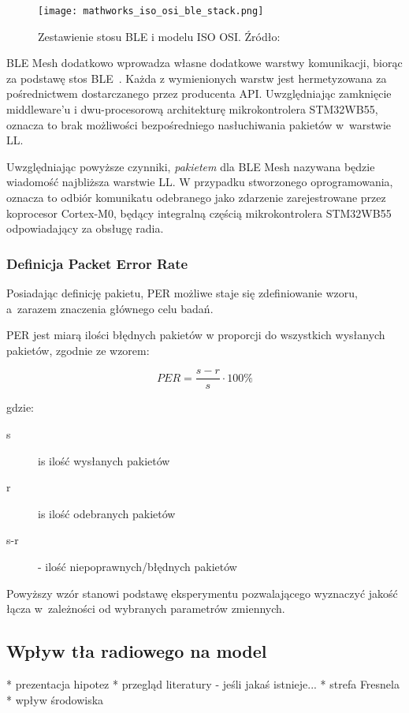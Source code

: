 \begin{figure}[!ht]
	\centering \texttt{[image: mathworks\_iso\_osi\_ble\_stack.png]} 
	\caption{Zestawienie stosu BLE i modelu ISO OSI. Źródło: \cite{noauthor_bluetooth_nodate}}
	\label{rys:agregacja_protokolow_ble}
\end{figure}

BLE Mesh dodatkowo wprowadza własne dodatkowe warstwy komunikacji, biorąc za podstawę stos BLE~\cite{mesh_working_group_mesh_2019}.
Każda z wymienionych warstw jest hermetyzowana za pośrednictwem dostarczanego przez producenta \gls{API}.
Uwzględniając zamknięcie middleware'u i dwu-procesorową architekturę mikrokontrolera STM32WB55, oznacza 
to brak możliwości bezpośredniego nasłuchiwania pakietów w~warstwie \gls{LL}.

Uwzględniając powyższe czynniki, \textit{pakietem} dla BLE Mesh nazywana będzie wiadomość najbliższa warstwie \gls{LL}.
W przypadku stworzonego oprogramowania, oznacza to odbiór komunikatu odebranego jako zdarzenie zarejestrowane przez
koprocesor Cortex-M0, będący integralną częścią mikrokontrolera STM32WB55 odpowiadający za obsługę radia.

\subsubsection{Definicja Packet Error Rate}
Posiadając definicję pakietu, \gls{PER} możliwe staje się zdefiniowanie wzoru, a~zarazem znaczenia
głównego celu badań.

PER jest miarą ilości błędnych pakietów w proporcji do wszystkich wysłanych pakietów, zgodnie ze wzorem:

\begin{equation}
\label{per_equation}
PER = \frac{s - r}{s} \cdot 100\%
\end{equation}

gdzie:

\begin{description}
\item[s] is ilość wysłanych pakietów
\item[r] is ilość odebranych pakietów
\item[s-r] - ilość niepoprawnych/błędnych pakietów
\end{description}

Powyższy wzór stanowi podstawę eksperymentu pozwalającego wyznaczyć jakość łącza w~zależności od
wybranych parametrów zmiennych.

\subsection{Wpływ tła radiowego na model}
* prezentacja hipotez
* przegląd literatury - jeśli jakaś istnieje...
* strefa Fresnela
* wpływ środowiska


